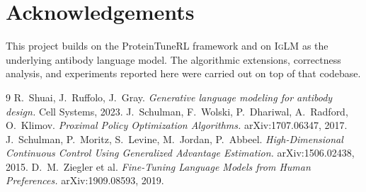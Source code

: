 \documentclass[11pt]{article}
\newcommand{\iglm}{\textsc{IgLM}}
\begin{document}
\section*{Acknowledgements}
This project builds on the ProteinTuneRL framework and on \iglm{} as the underlying
antibody language model. The algorithmic extensions, correctness analysis, and
experiments reported here were carried out on top of that codebase.

\begin{thebibliography}{9}
 R.~Shuai, J.~Ruffolo, J.~Gray. \emph{Generative language modeling
for antibody design.} Cell Systems, 2023.
 J.~Schulman, F.~Wolski, P.~Dhariwal, A.~Radford, O.~Klimov.
\emph{Proximal Policy Optimization Algorithms.} arXiv:1707.06347, 2017.
 J.~Schulman, P.~Moritz, S.~Levine, M.~Jordan, P.~Abbeel.
\emph{High-Dimensional Continuous Control Using Generalized Advantage
Estimation.} arXiv:1506.02438, 2015.
 D.~M.~Ziegler et al. \emph{Fine-Tuning Language Models from Human
Preferences.} arXiv:1909.08593, 2019.
\end{thebibliography}
\end{document}
